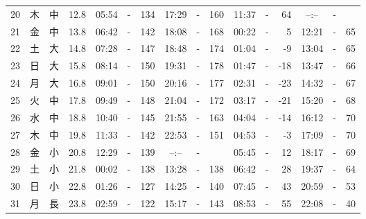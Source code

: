\documentclass[12pt.a4j]{jsarticle}
\begin{document}
\begin{center}
\begin{table}[ht]
\begin{tabular}{|rc|cr|ccrccr|ccrccr|}
20 & 木 & 中 & 12.8 &  05:54 &-& 134  &  17:29 &-& 160  &   11:37 &-&  64  &   --:-- &-&     \\
21 & 金 & 中 & 13.8 &  06:42 &-& 142  &  18:08 &-& 168  &   00:22 &-&   5  &   12:21 &-&  65  \\
22 & 土 & 大 & 14.8 &  07:28 &-& 147  &  18:48 &-& 174  &   01:04 &-&  -9  &   13:04 &-&  65  \\
23 & 日 & 大 & 15.8 &  08:14 &-& 150  &  19:31 &-& 178  &   01:47 &-& -18  &   13:47 &-&  66  \\
24 & 月 & 大 & 16.8 &  09:01 &-& 150  &  20:16 &-& 177  &   02:31 &-& -23  &   14:32 &-&  67  \\
25 & 火 & 中 & 17.8 &  09:49 &-& 148  &  21:04 &-& 172  &   03:17 &-& -21  &   15:20 &-&  68  \\
26 & 水 & 中 & 18.8 &  10:40 &-& 145  &  21:55 &-& 163  &   04:04 &-& -14  &   16:12 &-&  70  \\
27 & 木 & 中 & 19.8 &  11:33 &-& 142  &  22:53 &-& 151  &   04:53 &-&  -3  &   17:09 &-&  70  \\
28 & 金 & 小 & 20.8 &  12:29 &-& 139  &  --:-- &-&     &   05:45 &-&  12  &   18:17 &-&  69  \\
29 & 土 & 小 & 21.8 &  00:02 &-& 138  &  13:28 &-& 138  &   06:42 &-&  28  &   19:37 &-&  64  \\
30 & 日 & 小 & 22.8 &  01:26 &-& 127  &  14:25 &-& 140  &   07:45 &-&  43  &   20:59 &-&  53  \\
31 & 月 & 長 & 23.8 &  02:59 &-& 122  &  15:17 &-& 143  &   08:53 &-&  55  &   22:08 &-&  40  \\
   \hline
   \end{tabular}
\end{table}
\newpage
\end{center}
\end{document}
